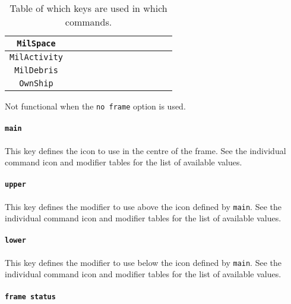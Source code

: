 \documentclass[a4paper, titlepage]{article}
\begin{document}
\begin{table}[H]
\begin{tabular}{|c|c|c|c|c|c|c|c|c|c|c|c|}
\texttt{MilSpace} &  &  &  &  &  &  &  &  \cellcolor{black} &  & \cellcolor{black} & \cellcolor{black}\\ \hline
\texttt{MilActivity} &  &  &  & \cellcolor{black} &  &  &  & \cellcolor{black} &  \cellcolor{black} &  & \cellcolor{black}\\ \hline
\texttt{MilDebris} & \cellcolor{black} & \cellcolor{black} & \cellcolor{black} & \cellcolor{black} & \cellcolor{black} & \cellcolor{black} & &  \cellcolor{black} & \cellcolor{black} & \cellcolor{black} & \cellcolor{black}\\ \hline
\texttt{OwnShip} & \cellcolor{black} & \cellcolor{black} & \cellcolor{black} & \cellcolor{black} & \cellcolor{black} & \cellcolor{black} & &  \cellcolor{black} & \cellcolor{black} & \cellcolor{black} & \cellcolor{black}\\ \hline
\end{tabular}
\begin{tablenotes}
\item \qquad *Not functional when the \texttt{no frame} option is used.
\end{tablenotes}
\caption{Table of which keys are used in which commands.}
\label{shared}
\end{table}

\paragraph{\texttt{main}}

This key defines the icon to use in the centre of the frame. See the individual command icon and modifier tables for the list of available values.

\paragraph{\texttt{upper}} 

This key defines the modifier to use above the icon defined by \texttt{main}. See the individual command icon and modifier tables for the list of available values.

\paragraph{\texttt{lower}} 

This key defines the modifier to use below the icon defined by \texttt{main}. See the individual command icon and modifier tables for the list of available values.

\paragraph{\texttt{frame status}}
\end{document}
